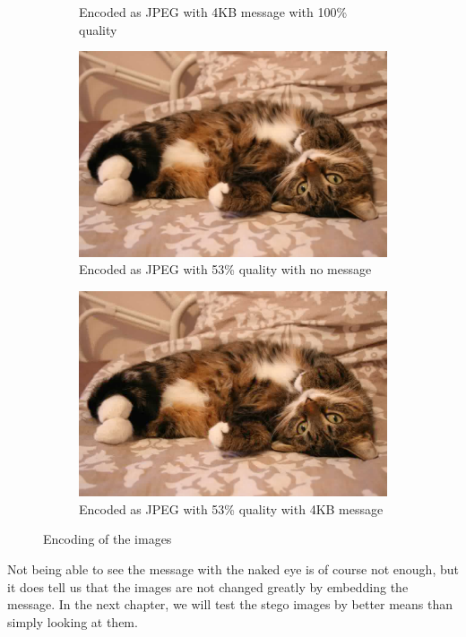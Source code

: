 \begin{figure}[H]
\begin{subfigure}[b]{0.45\textwidth}
		\caption{Encoded as JPEG with 4KB message with 100\% quality}
		\label{fig:catHighMessage}
    \end{subfigure}
    \begin{subfigure}[b]{0.45\textwidth}
        \includegraphics[width=\textwidth]{figures/catToTestNoMessage.jpeg}
		\caption{Encoded as JPEG with 53\% quality with no message}
		\label{fig:catJPEGNoMessage}
    \end{subfigure}
    \begin{subfigure}[b]{0.45\textwidth}
        \includegraphics[width=\textwidth]{figures/catToTestWithMessage.jpeg}
		\caption{Encoded as JPEG with 53\% quality with 4KB message}
		\label{fig:catJPEGMessage}
    \end{subfigure}
    \caption{Encoding of the images\citep{FlickrImageCat}}
    \label{fig:ResultEncoding}
\end{figure}

Not being able to see the message with the naked eye is of course not enough, but it does tell us that the images are not changed greatly by embedding the message. In the next chapter, we will test the stego images by better means than simply looking at them. 